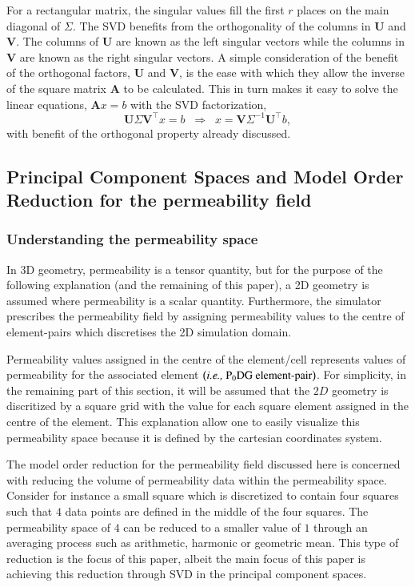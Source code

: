 \documentclass[preprint,12pt]{elsarticle}
\newcommand{\ie}{{\it i.e., }}
\begin{document}
\medskip
For a rectangular matrix, the singular values fill the first $r$ places on the main diagonal of $\Sigma$. The SVD benefits from the orthogonality of the columns in $\mathbf{U}$ and $\mathbf{V}$. The columns of $\mathbf{U}$ are known as the left singular vectors while the columns in $\mathbf{V}$ are known as the right singular vectors. A simple consideration of the benefit of the orthogonal factors, $\mathbf{U}$ and $\mathbf{V}$, is the ease with which they allow the inverse of the square matrix $\mathbf{A}$ to be calculated. This in turn makes it easy to solve the linear equations, $\mathbf{A}x = b$ with the SVD factorization,
\begin{equation}\label{e:SVD_factorization}
 \mathbf{U} \Sigma \mathbf{V}^{\intercal} x = b \;\;\Longrightarrow\;\; x = \mathbf{V} \Sigma^{-1} \mathbf{U}^{\intercal} b,
\end{equation} 
with benefit of the orthogonal property already discussed.


\subsection{Principal Component Spaces and Model Order Reduction for the permeability field}\label{subsection:pcspaces}
  
\subsubsection{Understanding the permeability space}\label{subsubsection:visualization_permspace}
In 3D geometry, permeability is a tensor quantity, but for the purpose of the following explanation (and the remaining of this paper), a 2D geometry is assumed where permeability is a scalar quantity. Furthermore, the simulator prescribes the permeability field by assigning permeability values to the centre of element-pairs \cite{Christou_2018} which discretises the 2D simulation domain.

Permeability values assigned in the centre of the element/cell represents values of permeability for the associated element $\left(\text{\ie P}_{0}\text{DG element-pair}\right)$. For simplicity, in the remaining part of this section, it will be assumed that the $2D$ geometry is discritized by a square grid with the value for each square element assigned in the centre of the element. This explanation allow one to easily visualize this permeability space because it is defined by the cartesian coordinates system.

The model order reduction for the permeability field discussed here is concerned with reducing the volume of permeability data within the permeability space. Consider for instance a small square which is discretized to contain four squares such that $4$ data points are defined in the middle of the four squares. The permeability space of $4$ can be reduced to a smaller value of $1$ through an averaging process such as arithmetic, harmonic or geometric mean. This type of reduction is the focus of this paper, albeit the main focus of this paper is achieving this reduction through SVD in the principal component spaces. 
\end{document}
